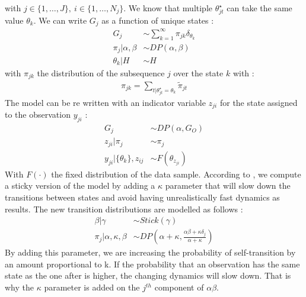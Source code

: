 with $j\in \{1,\dots, J\},\ i\in \{ 1,\dots, N_j\}$. We know that multiple $\theta^\star_{jt}$ can take the same value $\theta_k$. We can write $G_j$ as a function of unique states :
\begin{align*}
	G_j &\sim \sum^\infty_{k=1} \pi_{jk} \delta_{\theta_k} \\
	\pi_j|\alpha, \beta  &\sim DP(\alpha, \beta) \\
	\theta_k |H &\sim H
\end{align*}
with $\pi_{jk}$ the distribution of the subsequence $j$ over the state $k$ with : 
\begin{align*}
	\pi_{jk} = \sum_{t|\theta^\star_{jt}= \theta_k} \tilde{\pi}_{jt}
\end{align*}
The model can be re written with an indicator variable $z_{ji}$ for the state assigned to the observation $y_{ji}$ : 
\begin{align*}
	G_j &\sim DP(\alpha, G_O) \\
	z_{ji}|\pi_j &\sim \pi_j \\
	y_{ji}| \{\theta_k\}, z_{ij} &\sim F(\theta_{z_{ji}})
\end{align*}
With $F(\cdot)$ the fixed distribution of the data sample. According to \cite{fox_sticky_2011}, we compute a sticky version of the model by adding a $\kappa$ parameter that will slow down the transitions between states and avoid having unrealistically fast dynamics as results. The new transition distributions are modelled as follows : 
\begin{align*}
	\beta|\gamma &\sim Stick(\gamma) \\
	\pi_j| \alpha, \kappa, \beta  &\sim DP\left(\alpha + \kappa, \frac{\alpha\beta + \kappa \delta_j}{\alpha + \kappa} \right) 
\end{align*}
By adding this parameter, we are increasing the probability of self-transition by an amount proportional to k. If the probability that an observation has the same state as the one after is higher, the changing dynamics will slow down. That is why the $\kappa$ parameter is added on the $j^{th}$ component of $\alpha\beta$. \\

